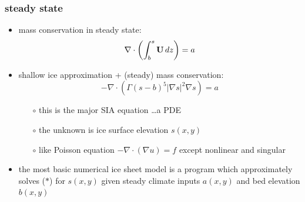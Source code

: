 \documentclass[10pt,hyperref={pdfpagelabels=true}]{beamer}
\newcommand{\Div}{\nabla\cdot}
\begin{document}
\begin{frame}
  \frametitle{steady state}

\begin{itemize}
\item mass conservation in steady state: 
  $$\Div \left(  \int_b^s {\bf U}\, dz \right)  =  a$$
\item shallow ice approximation + (steady) mass conservation:
\begin{equation}
- \Div \left(\Gamma (s-b)^5 | \nabla s |^2 \nabla s  \right) =  a  \tag{$\ast$}
\end{equation}
  \begin{itemize}
  \vspace{-0.2in}
  \item[$\circ$] this is the major SIA equation \dots a PDE
  \item[$\circ$] the unknown is ice surface elevation $s(x,y)$
  \item[$\circ$] like Poisson equation $-\Div (\nabla u) = f$ except nonlinear and singular
  \end{itemize}
\item the most basic numerical ice sheet model is a program which approximately solves ($\ast$) for $s(x,y)$ given steady climate inputs $a(x,y)$ and bed elevation $b(x,y)$
\end{itemize}
\end{frame}
\end{document}
